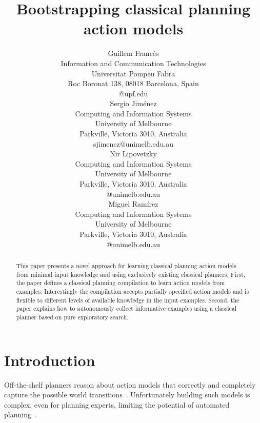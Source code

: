 \documentclass[letterpaper]{article} %
\begin{document}
\title{Bootstrapping classical planning action models}

\author{Guillem Franc\'es\\
{\small Information and Communication Technologies}\\
{\small Universitat Pompeu Fabra}\\
{\small Roc Boronat 138, 08018 Barcelona, Spain}\\
{\small @upf.edu}\\
\And Sergio Jim\'enez\\
{\small Computing and Information Systems}\\
{\small University of Melbourne}\\
{\small Parkville, Victoria 3010, Australia}\\
{\small sjimenez@unimelb.edu.au}\\
\And Nir Lipovetzky\\
{\small Computing and Information Systems}\\
{\small University of Melbourne}\\
{\small Parkville, Victoria 3010, Australia}\\
{\small @unimelb.edu.au}\\
\And Miguel Ram\'irez\\
{\small Computing and Information Systems}\\
{\small University of Melbourne}\\
{\small Parkville, Victoria 3010, Australia}\\
{\small @unimelb.edu.au}\\
}

\maketitle
\begin{abstract}
This paper presents a novel approach for learning classical planning action models from minimal input knowledge and using exclusively existing classical planners. First, the paper defines a classical planning compilation to learn action models from examples. Interestingly the compilation accepts partially specified action models and is flexible to different levels of available knowledge in the input examples. Second, the paper explains how to autonomously collect informative examples using a classical planner based on pure exploratory search. 
\end{abstract}


\section{Introduction}
Off-the-shelf planners reason about action models that correctly and completely capture the possible world transitions~\cite{geffner:book:2013}. Unfortunately building such models is complex, even for planning experts, limiting the potential of automated planning~\cite{kambhampati:modellite:AAAI2007}. 
\end{document}
